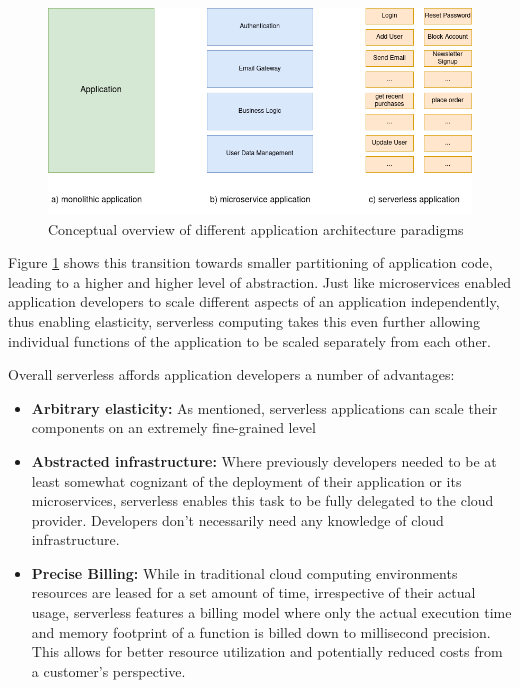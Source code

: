 \documentclass[draft,final]{vutinfth} %
\providecommand{\DIFaddbeginFL}{} %
\providecommand{\DIFaddendFL}{} %
\providecommand{\DIFdelbeginFL}{} %
\providecommand{\DIFdelendFL}{} %
\begin{document}
\begin{figure}
    \centering
    \DIFdelbeginFL %
\DIFdelendFL \DIFaddbeginFL \includegraphics[width=\columnwidth]{graphics/diagrams/monolith_micro_serverless.png}
    \DIFaddendFL \caption{Conceptual overview of different application architecture paradigms}
    \label{fig:mono_micro_serverless}
\end{figure}

Figure \ref{fig:mono_micro_serverless} shows this transition towards smaller partitioning of application code, leading to a higher and higher level of abstraction.
Just like microservices enabled application developers to scale different aspects of an application independently, thus enabling elasticity, serverless computing takes this even further allowing individual functions of the application to be scaled separately from each other\cite{jonasCloudProgrammingSimplified2019}.

Overall serverless affords application developers a number of advantages:
\begin{itemize}
    \item \textbf{Arbitrary elasticity:} As mentioned, serverless applications can scale their components on an extremely fine-grained level\cite{khandelwalTaureauDeconstructingServerless2020}
    \item \textbf{Abstracted infrastructure:} Where previously developers needed to be at least somewhat cognizant of the deployment of their application or its microservices, serverless enables this task to be fully delegated to the cloud provider. Developers don't necessarily need any knowledge of cloud infrastructure\cite{jonasCloudProgrammingSimplified2019}.
    \item \textbf{Precise Billing:} While in traditional cloud computing environments resources are leased for a set amount of time, irrespective of their actual usage\cite{khandelwalTaureauDeconstructingServerless2020}, serverless features a billing model where only the actual execution time and memory footprint of a function is billed down to millisecond precision\cite{jonasCloudProgrammingSimplified2019}. This allows for better resource utilization and potentially reduced costs from a customer's perspective\cite{khandelwalTaureauDeconstructingServerless2020}.
\end{itemize}
\end{document}
